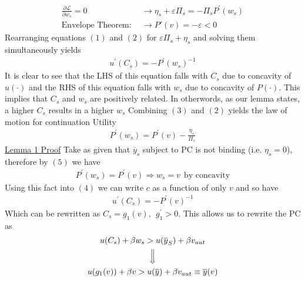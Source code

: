 \documentclass{article}
\begin{document}
\begin{itemize}
\begin{itemize}
\begin{itemize}
\begin{align*}
                \frac{\partial \mathcal{L}}{\partial w_{s}} = 0 &\rightarrow \eta_{s} + \varepsilon \Pi_{s} = - \Pi_{s}P^{'}(w_{s}) \tag{2} \\
                \text{Envelope Theorem}: \ \ &\rightarrow P'(v) = - \varepsilon < 0 \tag{3}
            \end{align*}
            Rearranging equations $(1)$ and $(2)$ for $\varepsilon \Pi_{s} + \eta_{s}$ and solving them simultaneously yields
            \begin{align*}
                u^{'}(C_{s}) = - P^{'}(w_{s})^{-1} \tag{4}
            \end{align*}
            It is clear to see that the LHS of this equation falls with $C_{s}$ due to concavity of $u(\cdot)$ and the RHS of this equation falls with $w_{s}$ due to concavity of $P(\cdot)$. This implies that $C_{s}$ and $w_{s}$ are positively related. In otherwords, as our lemma states, a higher $C_{s}$ results in a higher $w_{s}$
            \newline
            Combining $(3)$ and $(2)$ yields the law of motion for continuation Utility
            \begin{align*}
                P^{'}(w_{s}) = P^{'}(v) - \frac{\eta_{s}}{\Pi_{s}} \tag{5}
            \end{align*}
            \newline
            \underline{Lemma 1 Proof}
            \newline
            Take as given that $\overline{y}_{s}$ subject to PC is not binding (i.e. $\eta_{s} = 0$), therefore by $(5)$ we have
            \begin{gather*}
                P^{'}(w_{s}) = P^{'}(v) \Rightarrow w_{s} = v \ \ \text{by concavity}
            \end{gather*}
            Using this fact into $(4)$ we can write $c$ as a function of only $v$ and so have
            \begin{gather*}
                u^{'}(C_{s}) = -P^{'} (v)^{-1}
            \end{gather*}
            Which can be rewritten as $C_{s} = g_{1}(v), \ \ g_{1}^{'} > 0$. This allows us to rewrite the PC as
            \begin{gather*}
                u(C_{s}) + \beta w_{s} > u(\overline{y}_{S}) + \beta v_{aut} \\
                \Big\Downarrow \\
                u(g_{1}(v)) + \beta v > u(\overline{y}) + \beta v_{aut} \equiv \overline{y}(v) \\

\end{gather*}
\end{itemize}
\end{itemize}
\end{itemize}
\end{document}
